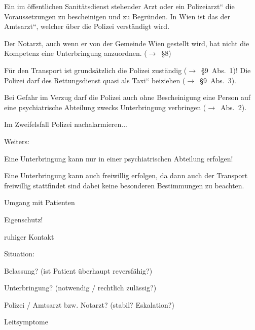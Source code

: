 \documentclass{article}
\begin{document}
Ein {\quotedblbase}im \"offentlichen Sanit\"atsdienst stehender Arzt
oder ein Polizeiarzt{\textquotedblleft} die Voraussetzungen zu
bescheinigen und zu Begr\"unden. In Wien ist das der
{\quotedblbase}Amtsarzt{\textquotedblleft}, welcher
\"uber die Polizei verst\"andigt wird. 

Der Notarzt, auch wenn er von der Gemeinde Wien gestellt wird, hat nicht
die Kompetenz eine Unterbringung anzuordnen. (${\rightarrow}$~{\S}8)

F\"ur den Transport ist grunds\"atzlich die Polizei zust\"andig
(${\rightarrow}$~{\S}9~Abs.~1)! Die Polizei darf des Rettungsdienst
quasi als {\quotedblbase}Taxi{\textquotedblleft} beiziehen
(${\rightarrow}$~{\S}9~Abs.~3). 

Bei Gefahr im Verzug darf die Polizei auch ohne Bescheinigung eine
Person auf eine psychiatrische Abteilung zwecks Unterbringung
verbringen (${\rightarrow}$~Abs.~2). 

Im Zweifelsfall Polizei nachalarmieren...

Weiters: 

Eine Unterbringung kann nur in einer psychiatrischen Abteilung erfolgen!

Eine Unterbringung kann auch freiwillig erfolgen, da dann auch der
Transport freiwillig stattfindet sind dabei keine besonderen
Bestimmungen zu beachten.

Umgang mit Patienten

Eigenschutz!

ruhiger Kontakt

Situation:

Belassung? (ist Patient \"uberhaupt  reversf\"ahig?)

Unterbringung? (notwendig / rechtlich  zul\"assig?)

Polizei / Amtsarzt bzw. Notarzt? (stabil?  Eskalation?)

Leitsymptome
\end{document}
